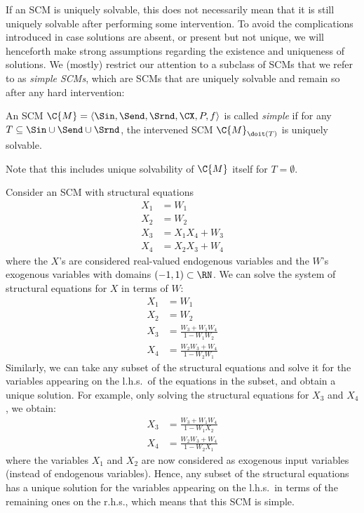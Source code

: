 If an SCM is uniquely solvable, this does not necessarily mean that it is still uniquely solvable
after performing some intervention. 
To avoid the complications introduced in case solutions are absent, or present but not unique,
we will henceforth make strong assumptions regarding the existence and uniqueness of solutions. 
We (mostly) restrict our attention to a subclass of SCMs that we refer to as \emph{simple SCMs},
which are SCMs that are uniquely solvable and remain so after any hard intervention:
\begin{Def}
  An SCM $\C{M} = \langle \Sin, \Send, \Srnd, \CX, P, f \rangle$ 
  is called \emph{simple} if for any $T \subseteq \Sin \cup \Send \cup \Srnd$, the intervened SCM
  $\C{M}_{\doit(T)}$ is uniquely solvable.
\end{Def}
Note that this includes unique solvability of $\C{M}$ itself for $T = \emptyset$.

\begin{Eg}
Consider an SCM with structural equations
  \begin{align*}
    X_1 &= W_1 \\
    X_2 &= W_2 \\
    X_3 &= X_1 X_4 + W_3 \\
    X_4 &= X_2 X_3 + W_4 
  \end{align*}
where the $X$'s are considered real-valued endogenous variables and the $W$'s exogenous variables with domains $(-1,1) \subset \RN$.
We can solve the system of structural equations for $X$ in terms of $W$:
  \begin{align*}
    X_1 &= W_1 \\
    X_2 &= W_2 \\
    X_3 &= \frac{W_3 + W_1 W_4}{1 - W_1 W_2} \\
    X_4 &= \frac{W_2 W_3 + W_4}{1 - W_2 W_1}
  \end{align*}
Similarly, we can take any subset of the structural equations and solve it for the variables appearing on the l.h.s.\ of the equations in the subset, and obtain a unique solution. For example, only solving the structural equations for $X_3$ and $X_4$, we obtain:
  \begin{align*}
    X_3 &= \frac{W_3 + W_1 W_4}{1 - W_1 X_2} \\
    X_4 &= \frac{W_2 W_3 + W_4}{1 - W_2 X_1}
  \end{align*}
where the variables $X_1$ and $X_2$ are now considered as exogenous input variables (instead of endogenous variables).
Hence, any subset of the structural equations has a unique solution for the variables appearing on the l.h.s.\ in terms
of the remaining ones on the r.h.s., which means that this SCM is simple.
\end{Eg}

